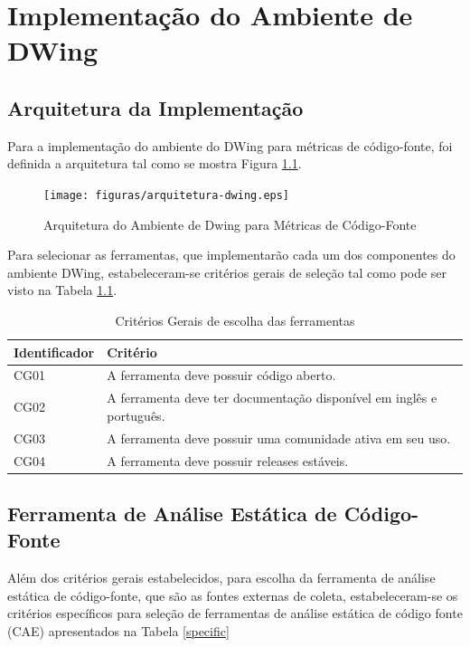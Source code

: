 \chapter{Implementação do Ambiente de DWing}
\label{estudo de caso}

\section{Arquitetura da Implementação}

Para a implementação do ambiente do DWing para métricas de código-fonte, foi definida a arquitetura tal como se mostra Figura \ref{arquitetura}.


\begin{figure}[ht!]
\centering
\texttt{[image: figuras/arquitetura-dwing.eps]}
\caption{Arquitetura do Ambiente de Dwing para Métricas de Código-Fonte}
\label{arquitetura}
\end{figure}
\FloatBarrier

Para selecionar as ferramentas, que implementarão cada um dos componentes do ambiente DWing, estabeleceram-se critérios gerais de seleção tal como pode ser visto na Tabela \ref{seleção}.


	\begin{table}[!ht]
	\begin{center}
	 \begin{tabular}{|l|l|}
		\hline
		Identificador & Critério 
		\\ \hline
		CG01 & A ferramenta deve possuir código aberto.  
		\\ \hline
		CG02 & A ferramenta deve ter documentação disponível em inglês e português.      
		\\ \hline
		CG03 & A ferramenta deve possuir uma comunidade ativa em seu uso.
		\\ \hline
		CG04 & A ferramenta deve possuir releases estáveis.    
		\\ \hline
		\end{tabular}
		\caption{Critérios Gerais de escolha das ferramentas}
		\label{seleção}
		\end{center}
		\end{table}	


\section{Ferramenta de Análise Estática de Código-Fonte}

Além dos critérios gerais estabelecidos, para escolha da ferramenta de análise estática de código-fonte, que são as fontes externas de coleta, estabeleceram-se os critérios específicos para seleção de ferramentas de análise estática de código fonte (CAE) apresentados na Tabela \ref{specific}


